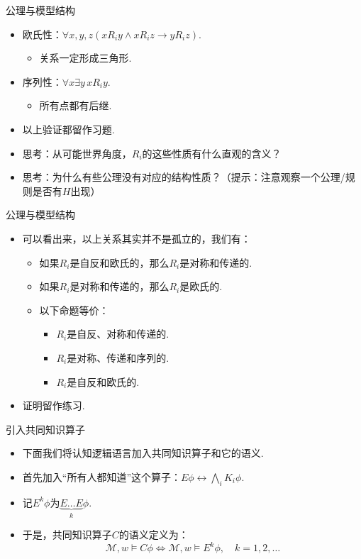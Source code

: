 \begin{frame}{公理与模型结构}
\begin{itemize}
    \item 欧氏性：$\forall x,y,z(xR_iy\wedge xR_iz\to yR_iz)$.
    \begin{itemize}
        \item 关系一定形成三角形.
    \end{itemize}
    \item 序列性：$\forall x\exists y\, xR_iy$.
    \begin{itemize}
        \item 所有点都有后继.
    \end{itemize}
    \item 以上验证都留作习题. %
    \item 思考：从可能世界角度，$R_i$的这些性质有什么直观的含义？
    \item 思考：为什么有些公理没有对应的结构性质？（提示：注意观察一个公理/规则是否有$H$出现）
\end{itemize}
\end{frame}

\begin{frame}{公理与模型结构}
\begin{itemize}
    \item 可以看出来，以上关系其实并不是孤立的，我们有：
\begin{lemma} %
\begin{itemize}
    \item 如果$R_i$是自反和欧氏的，那么$R_i$是对称和传递的.
    \item 如果$R_i$是对称和传递的，那么$R_i$是欧氏的.
    \item 以下命题等价：
    \begin{itemize}
        \item $R_i$是自反、对称和传递的.
\item  $R_i$是对称、传递和序列的.
\item $R_i$是自反和欧氏的.
    \end{itemize}
\end{itemize}
\end{lemma}
\item 证明留作练习.
\end{itemize}
\end{frame}

\begin{frame}{引入共同知识算子}
\begin{itemize}
    \item 下面我们将认知逻辑语言加入共同知识算子和它的语义.
    \item 首先加入“所有人都知道”这个算子：$E\phi\leftrightarrow\bigwedge_i K_i\phi$.
    \item 记$E^k\phi$为$\underbrace{E\dots E}_k\phi$.
    \item 于是，共同知识算子$C$的语义定义为：
    \[\mathcal M,w\vDash C\phi\iff\mathcal M,w\vDash E^k\phi,\quad k=1,2,\dots\]
\end{itemize}
\end{frame}

